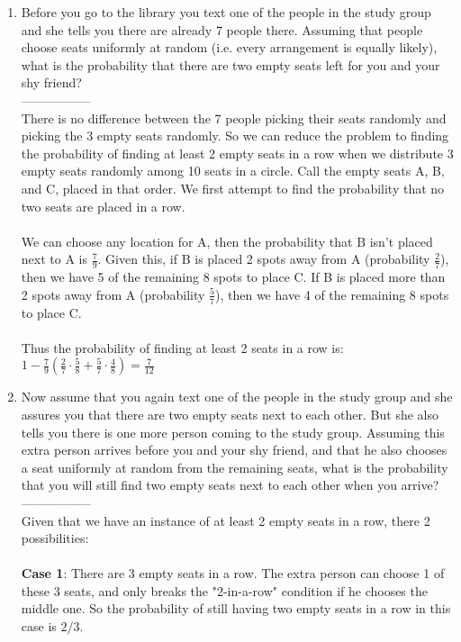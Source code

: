 \documentclass[11pt,fleqn]{article}
\begin{document}
\begin{enumerate}
\begin{enumerate}
\item Before you go to the library you text one of the people in the study group and she tells you there are already 7 people there. Assuming that people choose seats uniformly at random (i.e. every arrangement is equally likely), what is the probability that there are two empty seats left for you and your shy friend? \\
-----------------\\
There is no difference between the 7 people picking their seats randomly and picking the 3 empty seats randomly. So we can reduce the problem to finding the probability of finding at least 2 empty seats in a row when we distribute 3 empty seats randomly among 10 seats in a circle. Call the empty seats A, B, and C, placed in that order. We first attempt to find the probability that no two seats are placed in a row. \\\\
We can choose any location for A, then the probability that B isn't placed next to A is $\frac79$. Given this, if B is placed 2 spots away from A (probability $\frac27$), then we have 5 of the remaining 8 spots to place C. If B is placed more than 2 spots away from A (probability $\frac57$), then we have 4 of the remaining 8 spots to place C. \\\\
Thus the probability of finding at least 2 seats in a row is: \\
$1 - \frac79(\frac27 \cdot \frac58 + \frac57 \cdot \frac48) = \frac7{12}$
\item Now assume that you again text one of the people in the study group and she assures you that there are two empty seats next to each other. But she also tells you there is one more person coming to the study group. Assuming this extra person arrives before you and your shy friend, and that he also chooses a seat uniformly at random from the remaining seats, what is the probability that you will still find two empty seats next to each other when you arrive? \\
-----------------\\
Given that we have an instance of at least 2 empty seats in a row, there 2 possibilities: \\\\
\textbf{Case 1}: There are 3 empty seats in a row. The extra person can choose 1 of these 3 seats, and only breaks the "2-in-a-row" condition if he chooses the middle one. So the probability of still having two empty seats in a row in this case is $2/3$. \\

\end{enumerate}
\end{enumerate}
\end{document}
